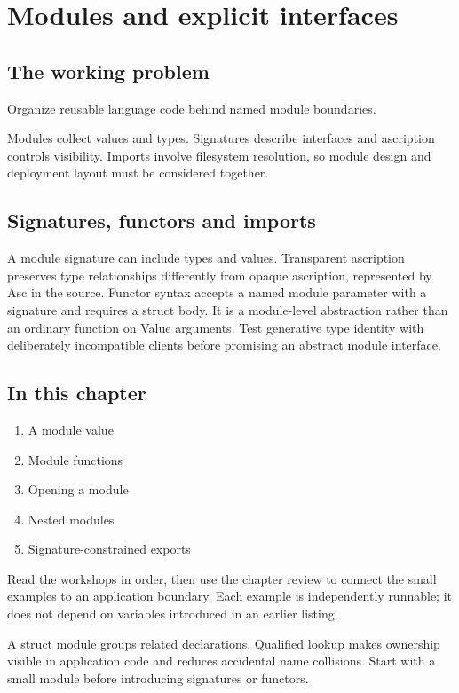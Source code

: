 \chapter{Modules and explicit interfaces}\label{ch:18}
\section*{The working problem}
Organize reusable language code behind named module boundaries.

Modules collect values and types. Signatures describe interfaces and ascription controls visibility. Imports involve filesystem resolution, so module design and deployment layout must be considered together.

\section*{Signatures, functors and imports}
A module signature can include types and values. Transparent ascription preserves type relationships differently from opaque ascription, represented by Asc in the source. Functor syntax accepts a named module parameter with a signature and requires a struct body. It is a module-level abstraction rather than an ordinary function on Value arguments. Test generative type identity with deliberately incompatible clients before promising an abstract module interface.

\section*{In this chapter}
\begin{enumerate}
\item A module value
\item Module functions
\item Opening a module
\item Nested modules
\item Signature-constrained exports
\end{enumerate}
Read the workshops in order, then use the chapter review to connect the small examples to an application boundary. Each example is independently runnable; it does not depend on variables introduced in an earlier listing.

\clearpage
{}
A struct module groups related declarations. Qualified lookup makes ownership visible in application code and reduces accidental name collisions. Start with a small module before introducing signatures or functors.

